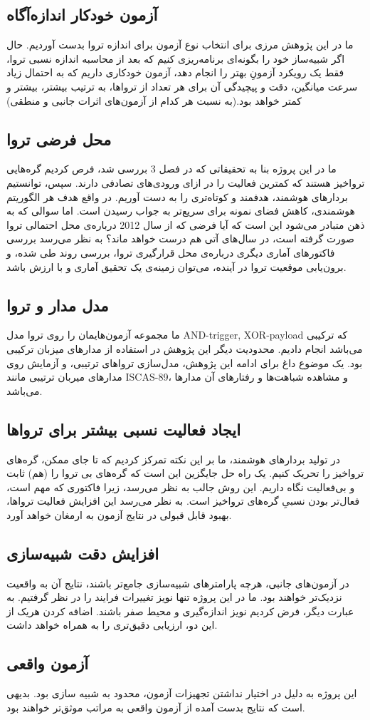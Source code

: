 \subsection{آزمون خودکار اندازه‌آگاه}
ما در این پژوهش مرزی برای انتخاب نوع آزمون برای اندازه تروا بدست آوردیم. حال اگر شبیه‌ساز خود را بگونه‌ای برنامه‌ریزی کنیم که بعد از محاسبه اندازه نسبی تروا، فقط یک رویکرد آزمونِ بهتر را انجام دهد، آزمون خودکاری داریم که به احتمال زیاد سرعت میانگین، دقت و پیچیدگی آن برای هر تعداد از تروا‌ها، به ترتیب بیشتر، بیشتر و کمتر خواهد بود.(به نسبت هر کدام از آزمون‌های اثرات جانبی و منطقی)
\subsection{محل فرضی تروا}
ما در این پروژه بنا به تحقیقاتی که در فصل 3 بررسی شد، فرص کردیم گره‌هایی تروا‌خیز هستند که کمترین فعالیت را در ازای ورودی‌های تصادفی دارند. سپس، توانستیم بردارهای هوشمند، هدفمند و کوتاه‌تری را به دست آوریم. در واقع هدف هر الگوریتم هوشمندی، کاهش فضای نمونه برای سریع‌تر به جواب رسیدن است.  اما سوالی که به ذهن متبادر می‌شود این است که آیا فرضی که از سال 2012 درباره‌ی محل احتمالی تروا صورت گرفته است، در سال‌های آتی هم درست خواهد ماند؟ به نظر می‌رسد بررسی فاکتورهای آماری دیگری درباره‌ی محل قرارگیری تروا، بررسی روند طی شده، و برون‌یابی موقعیت تروا در آینده، می‌توان زمینه‌ی یک تحقیق آماری و با ارزش باشد.
\subsection{مدل مدار و تروا}
ما مجموعه آزمون‌هایمان را روی تروا مدل AND-trigger, XOR-payload که ترکیبی می‌باشد انجام دادیم. محدودیت دیگر این پژوهش در استفاده از مدارهای میزبان ترکیبی بود. یک موضوع داغ برای ادامه این پژوهش، مدل‌سازی تروا‌های ترتیبی، و آزمایش روی مدارهای میربان ترتیبی مانند ISCAS-89، و مشاهده شباهت‌ها و رفتارهای آن مدارها می‌باشد.
\subsection{ایجاد فعالیت نسبی بیشتر برای تروا‌ها}
در تولید بردارهای هوشمند، ما بر این نکته تمرکز کردیم که تا جای ممکن، گره‌های تروا‌خیز را تحریک کنیم. یک راه حل جایگزین این است که گره‌های بی تروا را (هم) ثابت و بی‌فعالیت نگاه داریم. این روش جالب به نظر می‌رسد، زیرا فاکتوری که مهم است، فعال‌تر بودن نسبیِ گره‌های تروا‌خیز است. به نظر می‌رسد این افزایش فعالیت تروا‌ها، بهبود قابل قبولی در نتایج آزمون به ارمغان خواهد آورد.
\subsection{افزایش دقت شبیه‌سازی}
در آزمون‌های جانبی، هرچه پارامترهای شبیه‌سازی جامع‌تر باشند، نتایج آن به واقعیت نزدیک‌تر خواهند بود. ما در این پروژه تنها نویز تغییرات فرایند را در نظر گرفتیم. به عبارت دیگر، فرض کردیم نویز اندازه‌گیری و محیط صفر باشند. اضافه کردن هریک از این دو، ارزیابی دقیق‌تری را به همراه خواهد داشت.
\subsection{آزمون واقعی}
این پروژه به دلیل در اختیار نداشتن تجهیزات آزمون، محدود به شبیه سازی بود. بدیهی است که نتایج بدست آمده از آزمون واقعی به مراتب موثق‌تر خواهند بود. 
